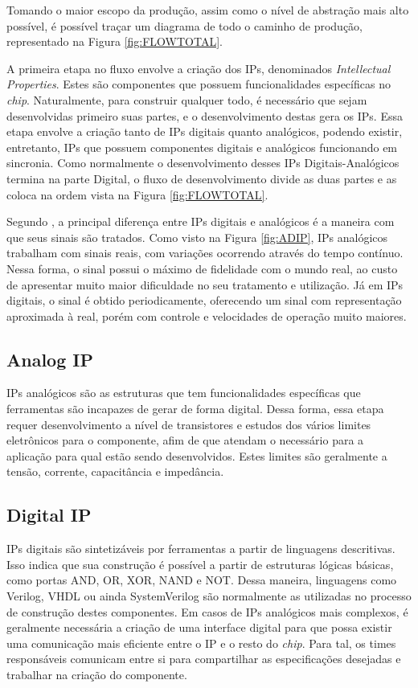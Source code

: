 \documentclass[
	12pt,				%
    oneside,			%
	a4paper,			%
	english,			%
	french,				%
	spanish,			%
	brazil				%
	]{abntex2}
\begin{document}
Tomando o maior escopo da produção, assim como o nível de abstração mais alto possível, é possível traçar um diagrama de todo o caminho de produção, representado na Figura \ref{fig:FLOWTOTAL}.



A primeira etapa no fluxo envolve a criação dos IPs, denominados \textit{Intellectual Properties}. Estes são componentes que possuem funcionalidades específicas no \textit{chip}. Naturalmente, para construir qualquer todo, é necessário que sejam desenvolvidas primeiro suas partes, e o desenvolvimento destas gera os IPs. Essa etapa envolve a criação tanto de IPs digitais quanto analógicos, podendo existir, entretanto, IPs que possuem componentes digitais e analógicos funcionando em sincronia. Como normalmente o desenvolvimento desses IPs Digitais-Analógicos termina na parte Digital, o fluxo de desenvolvimento divide as duas partes e as coloca na ordem vista na Figura \ref{fig:FLOWTOTAL}.



Segundo \citeauthor{Bakshi2}, a principal diferença entre IPs digitais e analógicos é a maneira com que seus sinais são tratados. Como visto na Figura \ref{fig:ADIP}, IPs analógicos trabalham com sinais reais, com variações ocorrendo através do tempo contínuo. Nessa forma, o sinal possui o máximo de fidelidade com o mundo real, ao custo de apresentar muito maior dificuldade no seu tratamento e utilização. Já em IPs digitais, o sinal é obtido periodicamente, oferecendo um sinal com representação aproximada à real, porém com controle e velocidades de operação muito maiores.

\subsection{Analog IP}

IPs analógicos são as estruturas que tem funcionalidades específicas que ferramentas são incapazes de gerar de forma digital. Dessa forma, essa etapa requer desenvolvimento a nível de transistores e estudos dos vários limites eletrônicos para o componente, afim de que atendam o necessário para a aplicação para qual estão sendo desenvolvidos. Estes limites são geralmente a tensão, corrente, capacitância e impedância.

\subsection{Digital IP}

IPs digitais são sintetizáveis por ferramentas a partir de linguagens descritivas. Isso indica que sua construção é possível a partir de estruturas lógicas básicas, como portas AND, OR, XOR, NAND e NOT. Dessa maneira, linguagens como Verilog, VHDL ou ainda SystemVerilog são normalmente as utilizadas no processo de construção destes componentes. Em casos de IPs analógicos mais complexos, é geralmente necessária a criação de uma interface digital para que possa existir uma comunicação mais eficiente entre o IP e o resto do \textit{chip}. Para tal, os times responsáveis comunicam entre si para compartilhar as especificações desejadas e trabalhar na criação do componente.
\end{document}
